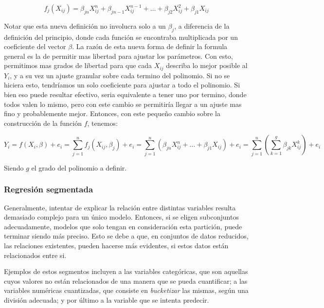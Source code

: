         \[f_j(X_{ij}) = \beta_{jn} {X_{ij}^n} + \beta_{jn-1} {X_{ij}^{n-1}} + \ldots + \beta_{j2} {X_{ij}^2} + \beta_{j1} X_{ij}\]
        
        Notar que esta nueva definición no involucra solo a un $\beta_j$, a diferencia de la definición del principio, donde cada función se encontraba multiplicada por un coeficiente del vector $\beta$. La razón de esta nueva forma de definir la formula general es la de permitir mas libertad para ajustar los parámetros. Con esto, permitimos mas grados de libertad para que cada $X_{ij}$ describa lo mejor posible al $Y_{i}$, y a su vez un ajuste granular sobre cada termino del polinomio. Si no se hiciera esto, tendríamos un solo coeficiente para ajustar a todo el polinomio. Si bien eso puede resultar efectivo, seria equivalente a tener uno por termino, donde todos valen lo mismo, pero con este cambio se permitiría llegar a un ajuste mas fino y probablemente mejor.
        Entonces, con este pequeño cambio sobre la construcción de la función $f$, tenemos:
        
        \[ 
        Y_i 
        = f(X_i,\beta) + e_i 
        = \sum_{j=1}^{n} f_j(X_{ij},\beta_j) + e_i 
        = \sum_{j=1}^{n} (\beta_{jn} {X_{ij}^n} + \ldots + \beta_{j1} X_{ij}) + e_i 
        = \sum_{j=1}^{n} (\sum_{k=1}^{g}\beta_{jk} {X_{ij}^k})  + e_i\]
        
        Siendo $g$ el grado del polinomio a definir.

    \subsubsection{Regresión segmentada}
        
        Generalmente, intentar de explicar la relación entre distintas variables resulta demasiado complejo para un único modelo. Entonces, si se eligen subconjuntos adecuadamente, modelos que solo tengan en consideración esta partición, puede terminar siendo más preciso. Esto se debe a que, en conjuntos de datos reducidos, las relaciones existentes, pueden hacerse más evidentes, si estos datos están relacionados entre si.
        
        Ejemplos de estos segmentos incluyen a las variables categóricas, que son aquellas cuyos valores no están relacionados de una manera que se pueda cuantificar; a las variables numéricas cuantizadas, que consiste en \emph{bucketizar} las mismas, según una división adecuada; y por último a la variable que se intenta predecir.
        
